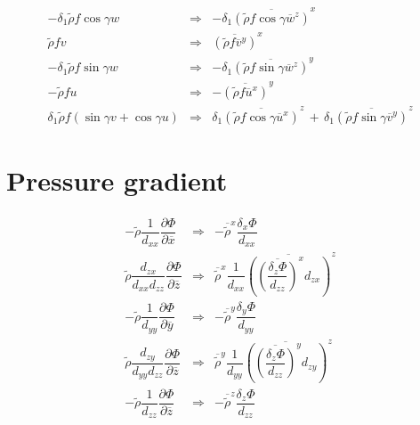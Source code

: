 \begin{eqnarray}
 - \delta _{1} \tilde{\rho} f \cos\gamma w & \Longrightarrow &
 - \delta _{1} \overline{ \left(\tilde{\rho} f \cos\gamma \overline{
 w}^{z}\right)}^{x}
 \\
 \tilde{\rho} f  v  & \Longrightarrow & \overline{ \left(\tilde{\rho} f
  \overline{ v  }^{y} \right)}^{x} \\
-\delta _{1}\tilde{\rho} f \sin\gamma w & \Longrightarrow &
-\delta _{1} \overline{ \left(\tilde{\rho} f \sin\gamma \overline{
 w}^{z}\right)}^{y} \\
 -   \tilde{\rho} f  u  & \Longrightarrow &
 - \overline{ \left(  \tilde{\rho} f \overline{  u }^{x}\right)}^{y} \\
\delta _{1}\tilde{\rho} f(\sin\gamma  v  + \cos\gamma  u )
 & \Longrightarrow & \delta _{1} \overline{ \left(\tilde{\rho} f
 \cos\gamma  \overline{   u  }^{x}\right)}^{z }\, + \, \delta _{1} \overline{ \left(\tilde{\rho} f
 \sin\gamma  \overline{   v  }^{y}\right)}^{z }
  \end{eqnarray}

\section{Pressure gradient}
\begin{eqnarray}
- \tilde{\rho}\dfrac{1}{d_{xx}}
\dfrac{\partial \Phi}{\partial \overline{x}}
 & \Longrightarrow & -  \overline{  \tilde{\rho}}^{x}\dfrac{\delta_{x} \Phi}{d_{xx}}
 \\
\tilde{\rho}\dfrac{d_{zx}}{d_{xx}d_{zz}}
\dfrac{\partial \Phi}{\partial \overline{z}}
 & \Longrightarrow &   \overline{ \tilde{\rho}}^{x} \dfrac{1}{d_{xx}}
\overline{ \left(\overline{ \left(\dfrac{\delta_{z} \Phi}{d_{zz}} \right)}^{x}d_{zx}\right)}^{z}\\
- \tilde{\rho}\dfrac{1}{d_{yy}}
\dfrac{\partial \Phi}{\partial \overline{y}}
 & \Longrightarrow & -   \overline{  \tilde{\rho}}^{y}
 \dfrac{\delta_{y} \Phi}{d_{yy}}
 \\
   \tilde{\rho}\dfrac{d_{zy}}{d_{yy}d_{zz}}
\dfrac{\partial \Phi}{\partial \overline{z}}
 & \Longrightarrow &  \overline{ \tilde{\rho}}^{y} \dfrac{1}{d_{yy}}
\overline{ \left(\overline{ \left(\dfrac{\delta_{z} \Phi}{d_{zz}}
\right)}^{y}d_{zy}\right)}^{z}\\
  -  \tilde{\rho}\dfrac{1}{d_{zz}}
  \dfrac{\partial \Phi}{\partial \overline{z}}
 & \Longrightarrow & - \overline{ \tilde{\rho}}^{z}  \dfrac{\delta_{z}
 \Phi}{d_{zz}}
   \end{eqnarray}

